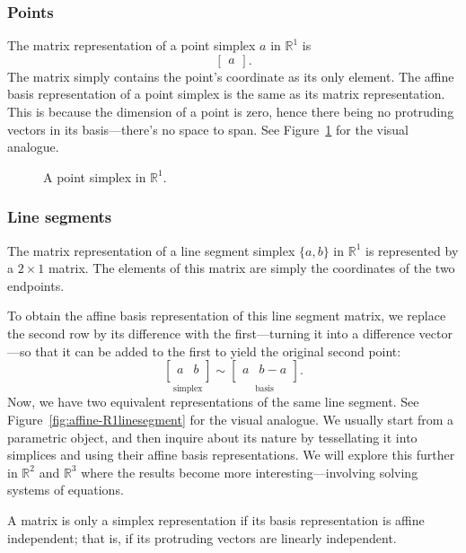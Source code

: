 \subsubsection{Points}

The matrix representation of a point simplex \(a\) in \(\mathbb{R}^{1}\) is 
\[
    \begin{bmatrix}
        a 
    \end{bmatrix}.
\]
The matrix simply contains the point's coordinate as its only element.
The affine basis representation of a point simplex is the same as its
matrix representation. This is because the dimension of a point is zero,
hence there being no protruding vectors in its basis---there's no space 
to span. See Figure~\ref{fig:affine-R1point} for the visual analogue.

\begin{figure}
    \centering 
    \caption{A point simplex in \(\mathbb{R}^{1}\).}
    \label{fig:affine-R1point}
\end{figure}

\subsubsection{Line segments}

The matrix representation of a line segment simplex \(\{a,b\}\) in 
\(\mathbb{R}^{1}\) is represented by a \(2\times1\) matrix. 
The elements of this matrix are simply the coordinates of the 
two endpoints. 

To obtain the affine basis representation of this line segment matrix,
we replace the second row by its difference with the first---turning 
it into a difference vector---so that it can be added to the first 
to yield the original second point:
\[
    \underset{\mbox{simplex}}{
        \begin{bmatrix}
            a & b \\
        \end{bmatrix}
    }
    \sim
    \underset{\mbox{basis}}{
        \begin{bmatrix}
            a & b-a \\
        \end{bmatrix}
    }.
\]
Now, we have two equivalent representations of the same line segment.
See Figure~\ref{fig:affine-R1linesegment} for the visual analogue.
We usually start from a parametric object, and then inquire about its nature 
by tessellating it into simplices and using their affine basis representations.
We will explore this further in \(\mathbb{R}^{2}\) and \(\mathbb{R}^{3}\)
where the results become more interesting---involving solving systems of equations.
\begin{remark}
    A matrix is only a simplex representation if its basis 
    representation is affine independent; that is, if its protruding 
    vectors are linearly independent.
\end{remark}

